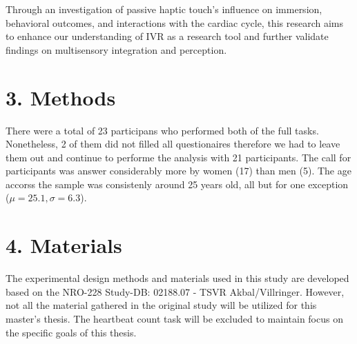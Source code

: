 \documentclass[12pt,oneside,openright]{report}
\begin{document}
Through an investigation of passive haptic touch's influence on immersion, behavioral outcomes, and interactions with the cardiac cycle, this research aims to enhance our understanding of IVR as a research tool and further validate findings on multisensory integration and perception.  

\section*{3. Methods}

There were a total of 23 participans who performed both of the full tasks. Nonetheless, 2 of them did not filled all questionaires therefore we had to leave them out and continue to performe the analysis with 21 participants. The call for participants was answer considerably more by women (17) than men (5). The age accorss the sample was consistenly around 25 years old, all but for one exception ($\mu=25.1 , \sigma=6.3$).

\section*{4. Materials}
The experimental design methods and materials used in this study are developed based on the NRO-228 Study-DB: 02188.07 - TSVR Akbal/Villringer. However, not all the material gathered in the original study will be utilized for this master's thesis. The heartbeat count task will be excluded to maintain focus on the specific goals of this thesis.
\end{document}
